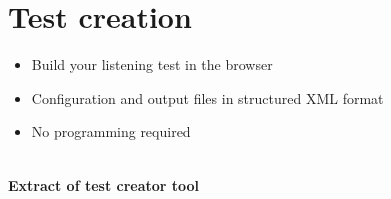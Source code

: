 \vspace{-0.8cm}
\section{Test creation} %

\begin{itemize}
	\item Build your listening test in the browser
	\item Configuration and output files in structured XML format
	\item No programming required
\end{itemize}

\begin{center}
\\ %
\small
\textbf{Extract of test creator tool}
\end{center}